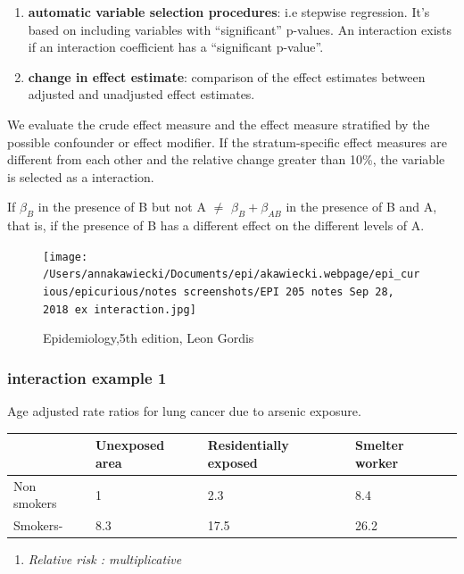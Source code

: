 \documentclass[
]{article}
\providecommand{\tightlist}{%
  \setlength{\itemsep}{0pt}\setlength{\parskip}{0pt}}
\begin{document}
\begin{enumerate}
\def\labelenumi{\arabic{enumi}.}
\item
  \textbf{automatic variable selection procedures}: i.e stepwise
  regression. It's based on including variables with ``significant''
  p-values. An interaction exists if an interaction coefficient has a
  ``significant p-value''.
\item
  \textbf{change in effect estimate}: comparison of the effect estimates
  between adjusted and unadjusted effect estimates.
\end{enumerate}

We evaluate the crude effect measure and the effect measure stratified
by the possible confounder or effect modifier. If the stratum-specific
effect measures are different from each other and the relative change
greater than 10\%, the variable is selected as a interaction.

If \(\beta_B\) in the presence of B but not A \(\ne\)
\(\beta_B+ \beta_{AB}\) in the presence of B and A, that is, if the
presence of B has a different effect on the different levels of A.

\begin{figure}
\centering
\texttt{[image: /Users/annakawiecki/Documents/epi/akawiecki.webpage/epi\_curious/epicurious/notes screenshots/EPI 205 notes Sep 28, 2018 ex interaction.jpg]}
\caption{Epidemiology,5th edition, Leon Gordis}
\end{figure}

\hypertarget{interaction-example-1}{%
\subsubsection{interaction example 1}\label{interaction-example-1}}

Age adjusted rate ratios for lung cancer due to arsenic exposure.

\begin{longtable}[]{@{}llll@{}}
\toprule
& Unexposed area & Residentially exposed & Smelter worker\tabularnewline
\midrule
\endhead
Non smokers & 1 & 2.3 & 8.4\tabularnewline
Smokers- & 8.3 & 17.5 & 26.2\tabularnewline
\bottomrule
\end{longtable}

\begin{enumerate}
\def\labelenumi{\arabic{enumi}.}
\tightlist
\item
  \emph{Relative risk : multiplicative}
\end{enumerate}
\end{document}
